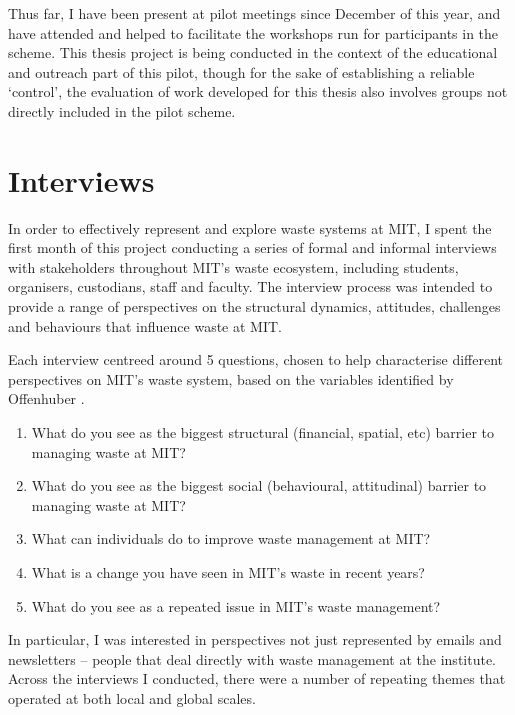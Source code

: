 \documentclass[nofonts,nols,justified,nobib]{tufte-book}
\begin{document}
Thus far, I have been present at pilot meetings since December of this year, and have attended and helped to facilitate the workshops run for participants in the scheme. This thesis project is being conducted in the context of the educational and outreach part of this pilot, though for the sake of establishing a reliable `control', the evaluation of work developed for this thesis also involves groups not directly included in the pilot scheme.

\newpage

\section*{Interviews}

In order to effectively represent and explore waste systems at MIT, I spent the first month of this project conducting a series of formal and informal interviews with stakeholders throughout MIT's waste ecosystem, including students, organisers, custodians, staff and faculty. The interview process was intended to provide a range of perspectives on the structural dynamics, attitudes, challenges and behaviours that influence waste at MIT.

Each interview centreed around 5 questions, chosen to help characterise different perspectives on MIT's waste system, based on the variables identified by Offenhuber \cite{offenhuber_waste_2017}.

\begin{enumerate}
\item What do you see as the biggest structural (financial, spatial, etc) barrier to managing waste at MIT?
\item What do you see as the biggest social (behavioural, attitudinal) barrier to managing waste at MIT?
\item What can individuals do to improve waste management at MIT?
\item What is a change you have seen in MIT's waste in recent years?
\item What do you see as a repeated issue in MIT's waste management?
\end{enumerate}

In particular, I was interested in perspectives not just represented by emails and newsletters -- people that deal directly with waste management at the institute. Across the interviews I conducted, there were a number of repeating themes that operated at both local and global scales.
\end{document}
